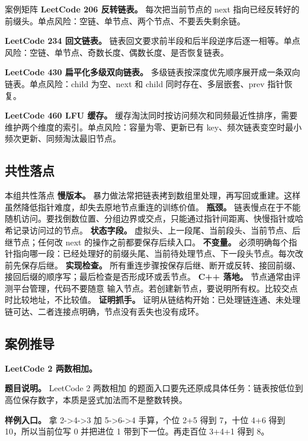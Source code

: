 \begin{principlebox}{案例矩阵}
\textbf{LeetCode 206 反转链表。}
每次把当前节点的 next 指向已经反转好的前缀头。单点风险：空链、单节点、两个节点、不要丢失剩余链。

\textbf{LeetCode 234 回文链表。}
链表回文要求前半段和后半段逆序后逐一相等。单点风险：空链、单节点、奇数长度、偶数长度、是否恢复链表。

\textbf{LeetCode 430 扁平化多级双向链表。}
多级链表按深度优先顺序展开成一条双向链表。单点风险：child 为空、next 和 child 同时存在、多层嵌套、prev 指针恢复。

\textbf{LeetCode 460 LFU 缓存。}
缓存淘汰同时按访问频次和同频最近性排序，需要维护两个维度的索引。单点风险：容量为零、更新已有 key、频次链表变空时最小频次更新、同频淘汰最旧节点。

\end{principlebox}

\subsection{共性落点}

\begin{principlebox}{本组共性落点}
\textbf{慢版本。} 暴力做法常把链表拷到数组里处理，再写回或重建。这样虽然降低指针难度，却失去原地节点重连的训练价值。
\textbf{瓶颈。} 链表慢点在于不能随机访问。要找倒数位置、分组边界或交点，只能通过指针间距离、快慢指针或哈希记录访问过的节点。
\textbf{状态字段。} 虚拟头、上一段尾、当前段头、当前节点、后继节点；任何改 next 的操作之前都要保存后续入口。
\textbf{不变量。} 必须明确每个指针指向哪一段：已经处理好的前缀头尾、当前待处理节点、下一段头节点。每次改  前先保存后继。
\textbf{实现检查。} 所有重连步骤按保存后继、断开或反转、接回前缀、接回后缀的顺序写；最后检查是否形成环或丢节点。
\textbf{C++ 落地。} 节点通常由评测平台管理，代码不要随意  输入节点。若创建新节点，要说明所有权。比较交点时比较地址，不比较值。
\textbf{证明抓手。} 证明从链结构开始：已处理链连通、未处理链可达、二者连接点明确，节点没有丢失也没有成环。
\end{principlebox}

\subsection{案例推导}

\noindent\textbf{LeetCode 2 两数相加。}

\textbf{题目说明。} LeetCode 2 两数相加 的题面入口要先还原成具体任务：链表按低位到高位保存数字，本质是竖式加法而不是整数转换。

\textbf{样例入口。} 拿 2->4->3 加 5->6->4 手算，个位 2+5 得到 7，十位 4+6 得到 10，所以当前位写 0 并把进位 1 带到下一位。再走百位 3+4+1 得到 8。

